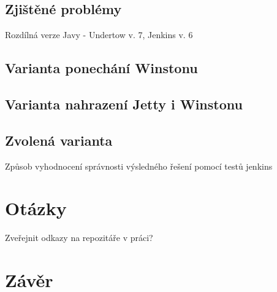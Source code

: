     \section{Zjištěné problémy}
        Rozdílná verze Javy - Undertow v. 7, Jenkins v. 6
        
        
    \section{Varianta ponechání Winstonu}

    \section{Varianta nahrazení Jetty i Winstonu}

    \section{Zvolená varianta}
        Způsob vyhodnocení správnosti výsledného řešení pomocí testů jenkins


\chapter{Otázky}
    Zveřejnit odkazy na repozitáře v práci?

\chapter{Závěr}





